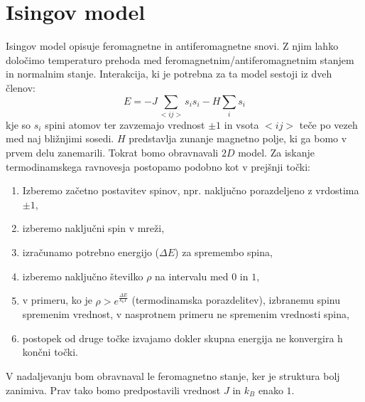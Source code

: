 \documentclass[slovene,11pt,a4paper]{article}
\numberwithin{equation}{section} %
\numberwithin{figure}{section} %
\numberwithin{table}{section} %
\begin{document}
\section{Isingov model}
Isingov model opisuje feromagnetne in antiferomagnetne snovi. Z njim lahko določimo temperaturo prehoda med feromagnetnim/antiferomagnetnim stanjem in normalnim stanje. Interakcija, ki je potrebna za ta model sestoji iz dveh členov:
\begin{equation}
E=-J \sum_{<ij>} s_i s_i - H \sum_i s_i
\end{equation}
kje so $s_i$ spini atomov ter zavzemajo vrednost $\pm 1$ in vsota $<ij>$ teče po vezeh med naj bližnjimi sosedi. $H$ predstavlja zunanje magnetno polje, ki ga bomo v prvem delu zanemarili. Tokrat bomo obravnavali $2D$ model. Za iskanje termodinamskega ravnovesja postopamo podobno kot v prejšnji točki:
\begin{enumerate}
\item Izberemo začetno postavitev spinov, npr. naključno porazdeljeno z vrdostima $\pm1$,
\item izberemo naključni spin v mreži,
\item izračunamo potrebno energijo ($\Delta E$) za spremembo spina,
\item izberemo naključno številko $\rho$ na intervalu med $0$ in $1$,
\item v primeru, ko je $\rho>e^{\frac{\Delta E}{k_b T}}$ (termodinamska porazdelitev), izbranemu spinu spremenim vrednost, v nasprotnem primeru ne spremenim vrednosti spina,
\item postopek od druge točke izvajamo dokler skupna energija ne konvergira h končni točki.
\end{enumerate}
V nadaljevanju bom obravnaval le feromagnetno stanje, ker je struktura bolj zanimiva. Prav tako bomo predpostavili vrednost $J$ in $k_B$ enako $1$.
\pagebreak
\end{document}
